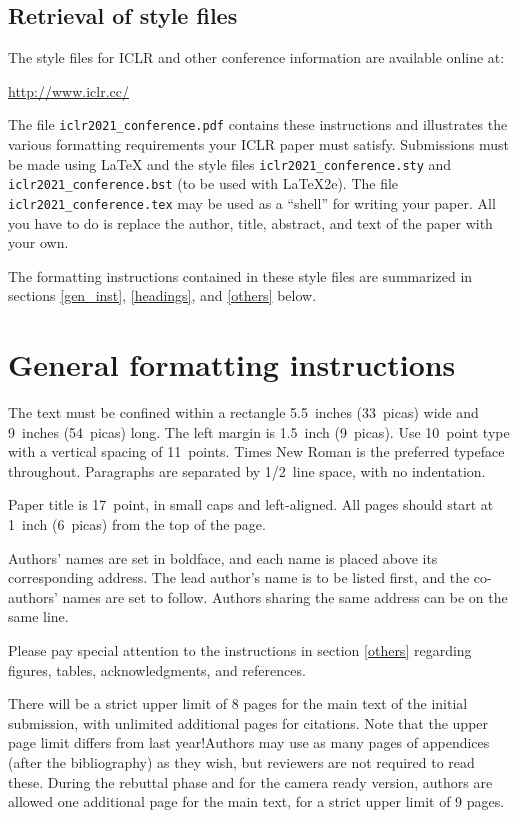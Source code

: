 \documentclass{article}
\begin{document}
\subsection*{Retrieval of style files}

The style files for ICLR and other conference information are available online at:
\begin{center}
   \url{http://www.iclr.cc/}
\end{center}
The file \verb+iclr2021_conference.pdf+ contains these
instructions and illustrates the
various formatting requirements your ICLR paper must satisfy.
Submissions must be made using \LaTeX{} and the style files
\verb+iclr2021_conference.sty+ and \verb+iclr2021_conference.bst+ (to be used with \LaTeX{}2e). The file
\verb+iclr2021_conference.tex+ may be used as a ``shell'' for writing your paper. All you
have to do is replace the author, title, abstract, and text of the paper with
your own.

The formatting instructions contained in these style files are summarized in
sections \ref{gen_inst}, \ref{headings}, and \ref{others} below.

\section*{General formatting instructions}
\label{gen_inst}

The text must be confined within a rectangle 5.5~inches (33~picas) wide and
9~inches (54~picas) long. The left margin is 1.5~inch (9~picas).
Use 10~point type with a vertical spacing of 11~points. Times New Roman is the
preferred typeface throughout. Paragraphs are separated by 1/2~line space,
with no indentation.

Paper title is 17~point, in small caps and left-aligned.
All pages should start at 1~inch (6~picas) from the top of the page.

Authors' names are
set in boldface, and each name is placed above its corresponding
address. The lead author's name is to be listed first, and
the co-authors' names are set to follow. Authors sharing the
same address can be on the same line.

Please pay special attention to the instructions in section \ref{others}
regarding figures, tables, acknowledgments, and references.


There will be a strict upper limit of 8 pages for the main text of the initial submission, with unlimited additional pages for citations. Note that the upper page limit differs from last year!Authors may use as many pages of appendices (after the bibliography) as they wish, but reviewers are not required to read these. During the rebuttal phase and for the camera ready version, authors are allowed one additional page for the main text, for a strict upper limit of 9 pages.
\end{document}
